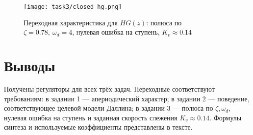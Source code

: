 \begin{figure}[H]
    \centering
    \texttt{[image: task3/closed\_hg.png]}
    \caption{Переходная характеристика для $HG(z)$: полюса по $\zeta=0.78,\ \omega_d=4$, нулевая ошибка на ступень, $K_v\approx0.14$}
\end{figure}

% 

\section{Выводы}
Получены регуляторы для всех трёх задач. Переходные соответствуют требованиям: в задании 1 — апериодический характер; в задании 2 — поведение, соответствующее целевой модели Даллина; в задании 3 — полюса по $\zeta,\omega_d$, нулевая ошибка на ступень и заданная скорость слежения $K_v\approx0.14$. Формулы синтеза и используемые коэффициенты представлены в тексте.


